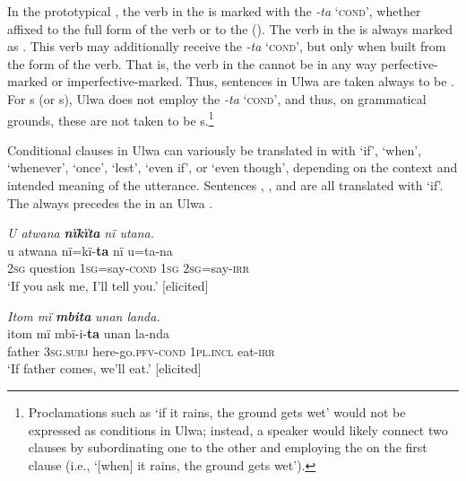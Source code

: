   In the prototypical , the verb in the  is marked with the   \textit{-ta} ‘\textsc{cond}’, whether affixed to the full  form of the verb or to the  (). The verb in the  is always marked as . This verb may additionally receive the  \textit{{}-ta} ‘\textsc{cond}’, but only when built from the  form of the verb. That is, the verb in the  cannot be in any way perfective-marked or imperfective-marked. Thus,  sentences in Ulwa are taken always to be  . For s (or s), Ulwa does not employ the  \textit{{}-ta} ‘\textsc{cond}’, and thus, on grammatical grounds, these are not taken to be s.\footnote{Proclamations such as ‘if it rains, the ground gets wet’ would not be expressed as conditions in Ulwa; instead, a speaker would likely connect two clauses by subordinating one to the other and employing the  on the first clause (i.e., ‘[when] it rains, the ground gets wet’).}

  Conditional clauses in Ulwa can variously be translated in  with ‘if’, ‘when’, ‘whenever’, ‘once’, ‘lest’, ‘even if’, or ‘even though’, depending on the context and intended meaning of the utterance. Sentences , , and  are all translated with ‘if’. The  always precedes the  in an Ulwa .

\ea%
    \label{ex:syntax:241}
          \textit{U atwana} \textbf{\textit{nïkïta}} \textit{nï utana.}\\
\gll    u    atwana    nï=kï-\textbf{ta}      nï    u=ta-na\\
    2\textsc{sg}  question  1\textsc{sg}=say\textsc{{}-cond}  \textsc{1sg}  \textsc{2sg}=say-\textsc{irr}\\
\glt `If you ask me, I’ll tell you.’ [elicited]
\z

\newpage

\ea%
    \label{ex:syntax:242}
          \textit{Itom mï} \textbf{\textit{mbita}} \textit{unan landa.}\\
\gll    itom  mï      mbï-i-\textbf{ta}      unan    la-nda\\
    father  \textsc{3sg.subj}  here-go.\textsc{pfv-cond}  1\textsc{pl.incl}  eat-\textsc{irr}\\
\glt `If father comes, we’ll eat.’ [elicited]
\z

